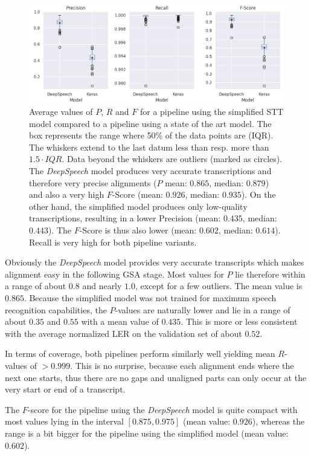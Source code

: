 \begin{figure}[h!]
	\includegraphics[width=\linewidth]{./img/boxplot_ls.png}
	\caption{Average values of $P$, $R$ and $F$ for a pipeline using the simplified \ac{STT} model compared to a pipeline using a state of the art model. The box represents the range where 50\% of the data points are (\ac{IQR}). The whiskers extend to the last datum less than resp. more than $1.5 \cdot IQR$. Data beyond the whiskers are outliers (marked as circles). The \textit{DeepSpeech} model produces very accurate transcriptions and therefore very precise alignments ($P$ mean: $0.865$, median: $0.879$) and also a very high $F$-Score (mean: $0.926$, median: $0.935$). On the other hand, the simplified model produces only low-quality transcriptions, resulting in a lower Precision (mean: $0.435$, median: $0.443$). The $F$-Score is thus also lower (mean: $0.602$, median: $0.614$). Recall is very high for both pipeline variants.}
	\label{pipeline_boxplot_ls_en}
\end{figure}

Obviously the \textit{DeepSpeech} model provides very accurate transcripts which makes alignment easy in the following \ac{GSA} stage. Most values for $P$ lie therefore within a range of about $0.8$ and nearly $1.0$, except for a few outliers. The mean value is $0.865$. Because the simplified model was not trained for maximum speech recognition capabilities, the $P$-values are naturally lower and lie in a range of about $0.35$ and $0.55$ with a mean value of $0.435$. This is more or less consistent with the average normalized \ac{LER} on the validation set of about $0.52$.

In terms of coverage, both pipelines perform similarly well yielding mean $R$-values of $>0.999$. This is no surprise, because each alignment ends where the next one starts, thus there are no gaps and unaligned parts can only occur at the very start or end of a transcript. 

The $F$-score for the pipeline using the \textit{DeepSpeech} model is quite compact with most values lying in the interval $[0.875, 0.975]$ (mean value: $0.926$), whereas the range is a bit bigger for the pipeline using the simplified model (mean value: $0.602$).

